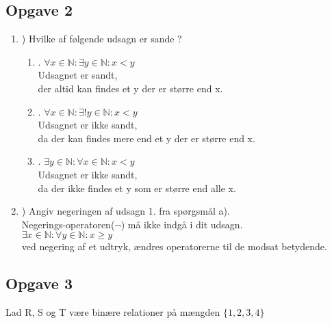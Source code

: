 \documentclass[a4paper,12pt]{article}
\begin{document}
\subsection{Opgave 2}

\begin{enumerate}
	\item) Hvilke af følgende udsagn er sande ?
\begin{enumerate}
	\item. \( \forall x \in  \mathbb{N}: \exists y \in \mathbb{N}: x < y\)\\

	Udsagnet er sandt,\\
	der altid kan findes et y der er større end x.\\
	
	\item. \(\forall x \in \mathbb{N}:\exists! y \in \mathbb{N}: x < y\)\\
	
	Udsagnet er ikke sandt,\\
	da der kan findes mere end et y der er større end x.\\
	
	\item. \( \exists y \in \mathbb{N}: \forall x \in \mathbb{N}: x < y\)\\
	
	Udsagnet er ikke sandt,\\
	da der ikke findes et y som er større end alle x.\\
	
\end{enumerate}
	\item) Angiv negeringen af udsagn 1. fra spørgsmål a).\\
	Negerings-operatoren($\neg$) må ikke indgå i dit udsagn.\\
	
	\(\exists x \in \mathbb{N}: \forall y \in \mathbb{N}: x \geq y\)\\
	ved negering af et udtryk, ændres operatorerne til de modsat betydende.
	
\end{enumerate}

\subsection{Opgave 3}
Lad R, S og T være binære relationer på mængden $\lbrace1,2,3,4 \rbrace$
\end{document}
